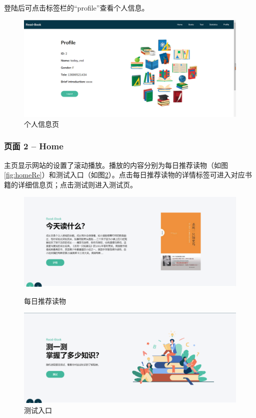 \documentclass[twoside,11pt]{article}
\begin{document}
登陆后可点击标签栏的“profile”查看个人信息。

\begin{figure}[H]
    \centering
    \includegraphics[width=0.6\columnwidth]{figures/prof.png}
    \caption{个人信息页}\label{fig:prof}
\end{figure}

\subsubsection{页面 2 -- Home}

主页显示网站的设置了滚动播放。播放的内容分别为每日推荐读物（如图\ref{fig:homeRe}）和测试入口（如图\ref{fig:homeTest}）。点击每日推荐读物的详情标签可进入对应书籍的详细信息页；点击测试则进入测试页。

\begin{figure}[htbp]
    \begin{minipage}[t]{0.5\linewidth}
        \centering
        \includegraphics[width=0.9\columnwidth]{figures/homeRe.png}
        \caption{每日推荐读物}\label{fig:homeRe}
    \end{minipage}
    \begin{minipage}[t]{0.5\linewidth}
        \centering
        \includegraphics[width=0.9\columnwidth]{figures/homeTest.png}
        \caption{测试入口}\label{fig:homeTest}
    \end{minipage}
\end{figure}
\end{document}
